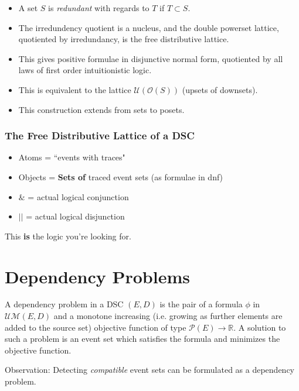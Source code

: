 \documentclass{beamer}
\newcommand{\UMc}{\mathcal{UM}}
\newcommand{\Oc}{\mathcal{O}}
\newcommand{\Pc}{\mathcal{P}}
\newcommand{\Ucc}{\mathcal{U}}
\begin{document}
\begin{frame}
\begin{itemize}
\item A set \(S\) is \textit{redundant} with regards to \(T\) if \(T \subset S\).
\item The irredundency quotient is a nucleus, and the double powerset lattice, quotiented by irredundancy, is the free distributive lattice.
\item This gives positive formulae in disjunctive normal form, quotiented by all laws of first order intuitionistic logic.
\item This is equivalent to the lattice \(\Ucc(\Oc(S))\) (upsets of downsets).
\item This construction extends from sets to posets.
\end{itemize}
\end{frame}

\begin{frame}
\frametitle{The Free Distributive Lattice of a DSC}

\begin{itemize}
\item Atoms = ``events with traces"
\item Objects = \textbf{Sets of} traced event sets (as formulae in dnf)
\item \(\&\) = actual logical conjunction
\item \(||\) = actual logical disjunction
\end{itemize}

This \textbf{is} the logic you're looking for.

\end{frame}

\section{Dependency Problems}
\begin{frame}
\begin{definition}
A dependency problem in a DSC \((E,D)\) is the pair of a formula \(\phi\) in \(\UMc(E,D)\) and a monotone increasing (i.e. growing as further elements are added to the source set) objective function of type \(\Pc(E) \rightarrow \mathbb{R}\). A solution to such a problem is an event set which satisfies the formula and minimizes the objective function.
\end{definition}

Observation: Detecting \textit{compatible} event sets can be formulated as a dependency problem.
\end{frame}
\end{document}
